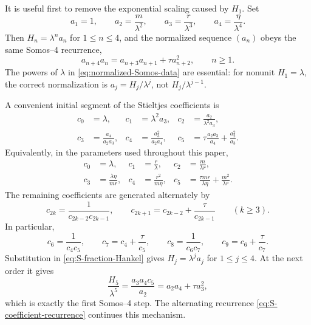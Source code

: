 \documentclass[11pt]{article}
\theoremstyle{remark}
\begin{document}
It is useful first to remove the exponential scaling caused by $H_1$.
Set
\begin{equation}
 a_1=1,\qquad
 a_2=\frac{m}{\lambda^2},\qquad
 a_3=\frac{r}{\lambda^3},\qquad
 a_4=\frac{\eta}{\lambda^4}.
 \label{eq:normalized-Somos-data}
\end{equation}
Then $H_n=\lambda^n a_n$ for $1\leq n\leq4$, and the normalized sequence
$(a_n)$ obeys the same Somos--4 recurrence,
\begin{equation}
 a_{n+4}a_n=a_{n+3}a_{n+1}+\tau a_{n+2}^2,\qquad n\geq1.
 \label{eq:normalized-Somos}
\end{equation}
The powers of $\lambda$ in \eqref{eq:normalized-Somos-data} are essential:
for nonunit $H_1=\lambda$, the correct normalization is
$a_j=H_j/\lambda^j$, not $H_j/\lambda^{j-1}$.

A convenient initial segment of the Stieltjes coefficients is
\begin{align}
 c_0&=\lambda, &
 c_1&=\lambda^2a_3, &
 c_2&=\frac{a_2}{\lambda^2a_3},\\
 c_3&=\frac{a_4}{a_2a_3}, &
 c_4&=\frac{a_3^2}{a_2a_4}, &
 c_5&=\tau\frac{a_2a_3}{a_4}+\frac{a_2^2}{a_3}.
 \label{eq:initial-S-coefficients}
\end{align}
Equivalently, in the parameters used throughout this paper,
\begin{equation}
 \begin{aligned}
 c_0&=\lambda,&
 c_1&=\frac{r}{\lambda},&
 c_2&=\frac{m}{\lambda r},\\
 c_3&=\frac{\lambda\eta}{mr},&
 c_4&=\frac{r^2}{m\eta},&
 c_5&=\frac{\tau mr}{\lambda\eta}+\frac{m^2}{\lambda r}.
 \end{aligned}
 \label{eq:initial-S-coefficients-original}
\end{equation}
The remaining coefficients are generated alternately by
\begin{equation}
 c_{2k}=\frac{1}{c_{2k-2}c_{2k-1}},\qquad
 c_{2k+1}=c_{2k-2}+\frac{\tau}{c_{2k-1}}
 \qquad(k\geq3).
 \label{eq:S-coefficient-recurrence}
\end{equation}
In particular,
\[
 c_6=\frac1{c_4c_5},\qquad
 c_7=c_4+\frac{\tau}{c_5},\qquad
 c_8=\frac1{c_6c_7},\qquad
 c_9=c_6+\frac{\tau}{c_7}.
\]
Substitution in \eqref{eq:S-fraction-Hankel} gives
$H_j=\lambda^j a_j$ for $1\leq j\leq4$.  At the next order it gives
\[
 \frac{H_5}{\lambda^5}=\frac{a_3a_4c_5}{a_2}
 =a_2a_4+\tau a_3^2,
\]
which is exactly the first Somos--4 step.  The alternating recurrence
\eqref{eq:S-coefficient-recurrence} continues this mechanism.
\end{document}
